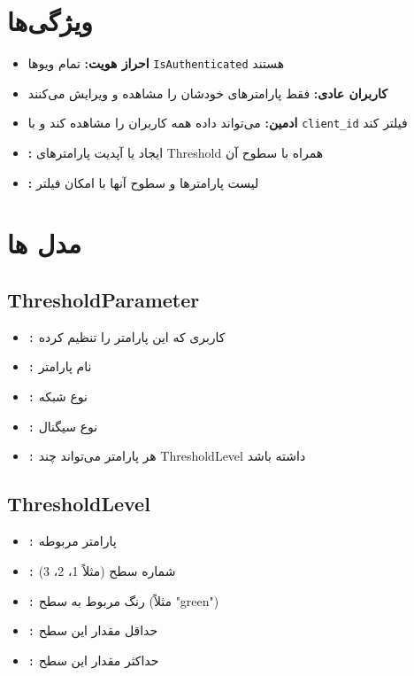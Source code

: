 \documentclass{report}
\begin{document}
\section{ویژگی‌ها}
\begin{itemize}
    \item \textbf{احراز هویت:} تمام ویوها \texttt{IsAuthenticated} هستند
    \item \textbf{کاربران عادی:} فقط پارامترهای خودشان را مشاهده و ویرایش می‌کنند
    \item \textbf{ادمین:} می‌تواند داده همه کاربران را مشاهده کند و با \texttt{client\_id} فیلتر کند
    \item \textbf{:} ایجاد یا آپدیت پارامترهای Threshold همراه با سطوح آن
    \item \textbf{:} لیست پارامترها و سطوح آنها با امکان فیلتر
\end{itemize}

\section{مدل ها}

\subsection{ThresholdParameter}
\begin{itemize}
    \item \texttt{:} کاربری که این پارامتر را تنظیم کرده
    \item \texttt{:} نام پارامتر 
    \item \texttt{:} نوع شبکه 
    \item \texttt{:} نوع سیگنال 
    \item \texttt{:} هر پارامتر می‌تواند چند ThresholdLevel داشته باشد
\end{itemize}

\subsection{ThresholdLevel}
\begin{itemize}
    \item \texttt{:} پارامتر مربوطه
    \item \texttt{:} شماره سطح (مثلاً 1، 2، 3)
    \item \texttt{:} رنگ مربوط به سطح (مثلاً "green")
    \item \texttt{:} حداقل مقدار این سطح
    \item \texttt{:} حداکثر مقدار این سطح
\end{itemize}
\end{document}
